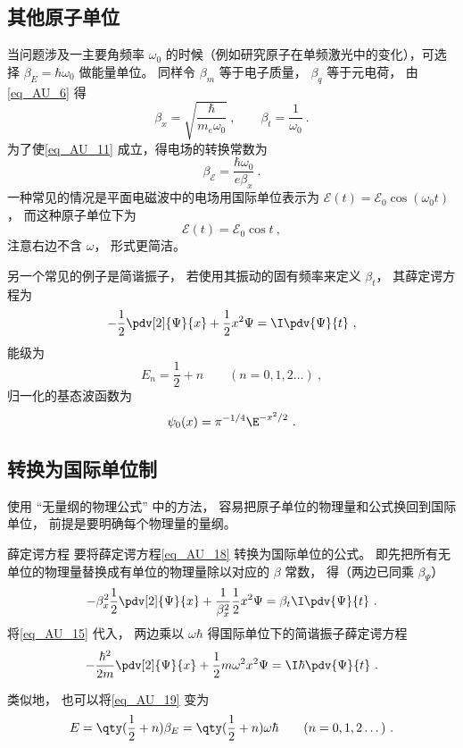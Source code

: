 \subsection{其他原子单位}

当问题涉及一主要角频率 $\omega_0$ 的时候（例如研究原子在单频激光中的变化），可选择 $\beta_E = \hbar\omega_0$ 做能量单位。 同样令 $\beta_m$ 等于电子质量， $\beta_q$ 等于元电荷， 由\autoref{eq_AU_6} 得
\begin{equation}\label{eq_AU_15}
\beta_x = \sqrt{\frac{\hbar}{m_e\omega_0}}~,
\qquad
\beta_t = \frac{1}{\omega_0}~.
\end{equation}
为了使\autoref{eq_AU_11} 成立，得电场的转换常数为
\begin{equation}
\beta_\mathcal{E} = \frac{\hbar\omega_0}{e \beta_x}~.
\end{equation}
一种常见的情况是平面电磁波中的电场用国际单位表示为 $\mathcal{E}(t) = \mathcal{E}_0\cos(\omega_0 t)$， 而这种原子单位下为
\begin{equation}
\mathcal{E}(t) = \mathcal{E}_0\cos t~,
\end{equation}
注意右边不含 $\omega$， 形式更简洁。

另一个常见的例子是简谐振子， 若使用其振动的固有频率来定义 $\beta_t$， 其薛定谔方程为
\begin{equation}\label{eq_AU_18}
-\frac12 \pdv[2]{\Psi}{x} + \frac12 x^2 \Psi= \I\pdv{\Psi}{t}~,
\end{equation}
能级为
\begin{equation}\label{eq_AU_19}
E_n = \frac12 + n \qquad (n = 0, 1, 2\dots)~,
\end{equation}
归一化的基态波函数为
\begin{equation}
\psi_0(x) = \pi^{-1/4} \E^{-x^2/2}~.
\end{equation}

\subsection{转换为国际单位制}
使用 “无量纲的物理公式” 中的方法， 容易把原子单位的物理量和公式换回到国际单位， 前提是要明确每个物理量的量纲。

\begin{example}{薛定谔方程}
要将薛定谔方程\autoref{eq_AU_18} 转换为国际单位的公式。 即先把所有无单位的物理量替换成有单位的物理量除以对应的 $\beta$ 常数， 得（两边已同乘 $\beta_\Psi$）
\begin{equation}
-\beta_x^2\frac12 \pdv[2]{\Psi}{x} + \frac{1}{\beta_x^2}\frac12 x^2 \Psi= \beta_t\I\pdv{\Psi}{t}~.
\end{equation}
将\autoref{eq_AU_15} 代入， 两边乘以 $\omega\hbar$ 得国际单位下的简谐振子薛定谔方程
\begin{equation}
-\frac{\hbar^2}{2m} \pdv[2]{\Psi}{x} + \frac12 m\omega^2 x^2 \Psi= \I\hbar\pdv{\Psi}{t}~.
\end{equation}

类似地， 也可以将\autoref{eq_AU_19} 变为
\begin{equation}
E =  \qty(\frac12 + n)\beta_E = \qty(\frac12 + n)\omega\hbar \qquad (n = 0, 1, 2\dots)~.
\end{equation}
\end{example}
